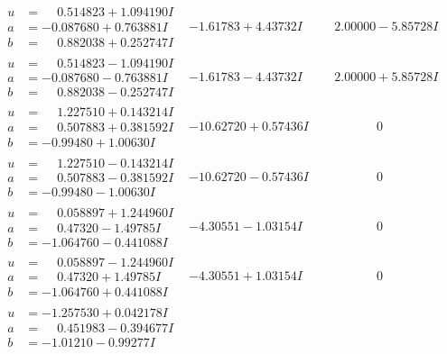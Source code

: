 \documentclass[1p]{elsarticle_modified}
\theoremstyle{definition}
\begin{document}
$$\begin{array}{c|c|c}
\begin{aligned}
u &= \phantom{-}0.514823 + 1.094190 I \\
a &= -0.087680 + 0.763881 I \\
b &= \phantom{-}0.882038 + 0.252747 I\end{aligned}
 & -1.61783 + 4.43732 I & \phantom{-}2.00000 - 5.85728 I \\ \hline\begin{aligned}
u &= \phantom{-}0.514823 - 1.094190 I \\
a &= -0.087680 - 0.763881 I \\
b &= \phantom{-}0.882038 - 0.252747 I\end{aligned}
 & -1.61783 - 4.43732 I & \phantom{-}2.00000 + 5.85728 I \\ \hline\begin{aligned}
u &= \phantom{-}1.227510 + 0.143214 I \\
a &= \phantom{-}0.507883 + 0.381592 I \\
b &= -0.99480 + 1.00630 I\end{aligned}
 & -10.62720 + 0.57436 I & \phantom{-0.000000 } 0 \\ \hline\begin{aligned}
u &= \phantom{-}1.227510 - 0.143214 I \\
a &= \phantom{-}0.507883 - 0.381592 I \\
b &= -0.99480 - 1.00630 I\end{aligned}
 & -10.62720 - 0.57436 I & \phantom{-0.000000 } 0 \\ \hline\begin{aligned}
u &= \phantom{-}0.058897 + 1.244960 I \\
a &= \phantom{-}0.47320 - 1.49785 I \\
b &= -1.064760 - 0.441088 I\end{aligned}
 & -4.30551 - 1.03154 I & \phantom{-0.000000 } 0 \\ \hline\begin{aligned}
u &= \phantom{-}0.058897 - 1.244960 I \\
a &= \phantom{-}0.47320 + 1.49785 I \\
b &= -1.064760 + 0.441088 I\end{aligned}
 & -4.30551 + 1.03154 I & \phantom{-0.000000 } 0 \\ \hline\begin{aligned}
u &= -1.257530 + 0.042178 I \\
a &= \phantom{-}0.451983 - 0.394677 I \\
b &= -1.01210 - 0.99277 I\end{aligned}

\end{array}$$
\end{document}
